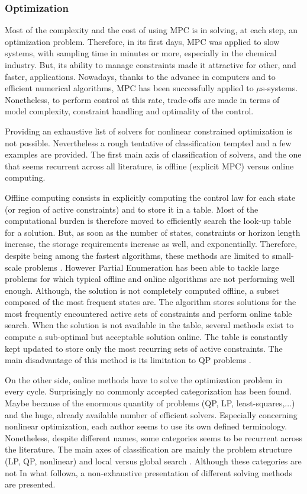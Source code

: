 \documentclass[a4paper, 12pt]{report}
\begin{document}
\subsubsection{Optimization}
Most of the complexity and the cost of using MPC is in solving, at each step, an optimization problem. Therefore, in its first days, MPC was applied to slow systems, with sampling time in minutes or more, especially in the chemical industry. But, its ability to manage constraints made it attractive for other, and faster, applications. Nowadays, thanks to the advance in computers and to efficient numerical algorithms, MPC has been successfully applied to $\mu$s-systems. Nonetheless, to perform control at this rate, trade-offs are made in terms of model complexity, constraint handling and optimality of the control. 

Providing an exhaustive list of solvers for nonlinear constrained optimization is not possible. Nevertheless a rough tentative of classification tempted and a few examples are provided. The first main axis of classification of solvers, and the one that seems recurrent across all literature, is offline (explicit MPC) versus online computing. 

Offline computing consists in explicitly computing the control law for each state (or region of active constraints) and to store it in a table. Most of the computational burden is therefore moved to efficiently search the look-up table for a solution. But, as soon as the number of states, constraints or horizon length increase, the storage requirements increase as well, and exponentially. Therefore, despite being among the fastest algorithms, these methods are limited to small-scale problems \cite{Haverbeke2011}. However Partial Enumeration has been able to tackle large problems for which typical offline and online algorithms are not performing well enough. Although, the solution is not completely computed offline, a subset composed of the most frequent states are. The algorithm stores solutions for the most frequently encountered active sets of constraints and perform online table search. When the solution is not available in the table, several methods exist to compute a sub-optimal but acceptable solution online. The table is constantly kept updated to store only the most recurring sets of active constraints. The main disadvantage of this method is its limitation to QP problems \cite{Pannocchia2007}. 

On the other side, online methods have to solve the optimization problem in every cycle. Surprisingly no commonly accepted categorization has been found. Maybe because of the enormous quantity of problems (QP, LP, least-squares,...) and the huge, already available number of efficient solvers. Especially concerning nonlinear optimization, each author seems to use its own defined terminology. Nonetheless, despite different names, some categories seems to be recurrent across the literature. The main axes of classification are mainly the problem structure (LP, QP, nonlinear) and local versus global search \cite{Haverbeke2011, Nocedal1999, Zheng2015}. Although these categories are not  In what followa, a non-exhaustive presentation of different solving methods are presented.
\end{document}

